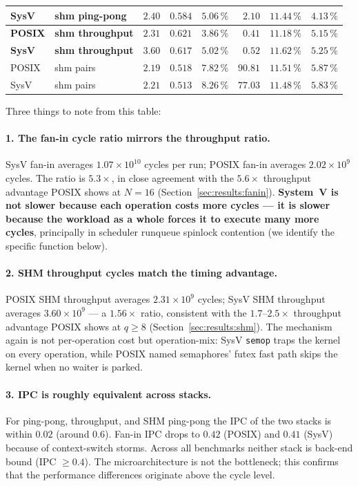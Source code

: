 \documentclass[a4paper,11pt]{article}
\begin{document}
\begin{table}[H]
\begin{tabular}{llrrrrrr}
SysV  & shm ping-pong   & $2.40$  & $0.584$ & $5.06\,\%$ & $2.10$  & $11.44\,\%$ & $4.13\,\%$ \\
\midrule
\textbf{POSIX} & \textbf{shm throughput} & \textbf{$2.31$} & $0.621$ & $3.86\,\%$ & $0.41$ & $11.18\,\%$ & $5.15\,\%$ \\
\textbf{SysV}  & \textbf{shm throughput} & \textbf{$3.60$} & $0.617$ & $5.02\,\%$ & $0.52$ & $11.62\,\%$ & $5.25\,\%$ \\
\midrule
POSIX & shm pairs       & $2.19$  & $0.518$ & $7.82\,\%$ & $90.81$ & $11.51\,\%$ & $5.87\,\%$ \\
SysV  & shm pairs       & $2.21$  & $0.513$ & $8.26\,\%$ & $77.03$ & $11.48\,\%$ & $5.83\,\%$ \\
\bottomrule
\end{tabular}
\end{table}

Three things to note from this table:

\paragraph{1. The fan-in cycle ratio mirrors the throughput ratio.}
SysV fan-in averages $1.07\times 10^{10}$ cycles per run; POSIX
fan-in averages $2.02\times 10^{9}$ cycles. The ratio is $5.3\times$,
in close agreement with the $5.6\times$ throughput advantage POSIX
shows at $N=16$ (Section~\ref{sec:results:fanin}). \textbf{System~V is
not slower because each operation costs more cycles --- it is slower
because the workload as a whole forces it to execute many more
cycles}, principally in scheduler runqueue spinlock contention (we
identify the specific function below).

\paragraph{2. SHM throughput cycles match the timing advantage.}
POSIX SHM throughput averages $2.31\times 10^{9}$ cycles; SysV SHM
throughput averages $3.60\times 10^{9}$ --- a $1.56\times$ ratio,
consistent with the $1.7$--$2.5\times$ throughput advantage POSIX
shows at $q\geq 8$ (Section~\ref{sec:results:shm}). The mechanism
again is not per-operation cost but operation-mix: SysV \texttt{semop}
traps the kernel on every operation, while POSIX named semaphores'
futex fast path skips the kernel when no waiter is parked.

\paragraph{3. IPC is roughly equivalent across stacks.} For ping-pong,
throughput, and SHM ping-pong the IPC of the two stacks is within
$0.02$ (around $0.6$). Fan-in IPC drops to $0.42$ (POSIX) and $0.41$
(SysV) because of context-switch storms. Across all benchmarks
neither stack is back-end bound (IPC $\geq 0.4$). The
microarchitecture is not the bottleneck; this confirms that the
performance differences originate above the cycle level.
\end{document}
